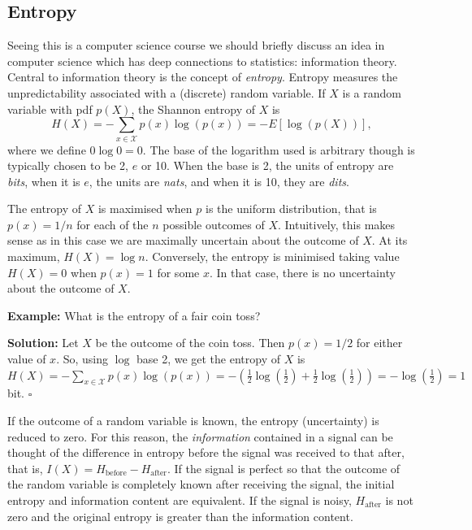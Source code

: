 \documentclass[11pt]{article}
\newcommand{\sqend}{\hfill $\square$}
\begin{document}
 \subsection{Entropy}

Seeing this is a computer science course we should briefly discuss an idea in computer science which has deep connections to statistics: information theory.  Central to information theory is the concept of {\em entropy}.  Entropy measures the unpredictability associated with a (discrete) random variable.  If $X$ is a random variable with pdf $p(X)$, the Shannon entropy of $X$ is 
\[H(X) = -\sum_{x \in \mathcal{X}} p(x) \log(p(x))  = -E[\log(p(X))],\]  where we define $0\log 0 = 0$.  The base of the logarithm used is arbitrary though is typically chosen to be 2, $e$ or 10.   When the base is 2, the units of entropy are {\em bits}, when it is $e$, the units  are {\em nats}, and  when it is 10, they are {\em dits}.
 
The entropy of $X$ is maximised when $p$ is the uniform distribution, that is $p(x) = 1/n$ for each of the $n$ possible outcomes of $X$.  Intuitively, this makes sense as in this case we are maximally uncertain about the outcome of $X$.  At its maximum, $H(X) = \log n$.  Conversely, the entropy is minimised taking value $H(X) = 0$ when $p(x) = 1$ for some $x$.  In that case, there is no uncertainty about the outcome of $X$. 

{\bf Example:} What is the entropy of a fair coin toss?

{\bf Solution:}  Let $X$ be the outcome of the coin toss.  Then $p(x) =1/2$ for either value of $x$.  So, using $\log$ base 2, we get the entropy of $X$ is  $H(X) = -\sum_{x \in \mathcal{X}} p(x) \log(p(x))  =    - (\frac 1 2 \log(\frac 1 2) + \frac 1 2 \log(\frac 1 2) )= -  \log(\frac 1 2)  = 1$ bit. \sqend


If the outcome of a random variable is known, the entropy (uncertainty) is reduced to zero.  For this reason, the {\em information} contained in a  signal can be thought of the difference in entropy before the signal was received to that after, that is, $I(X)  = H_{\mbox{before}} - H_{\mbox{after}}$. If the signal is perfect so that the outcome of the random variable is completely known after receiving the signal, the initial entropy and information content are equivalent.  If the signal is noisy, $H_{\mbox{after}}$ is not zero and the original entropy is greater than the information content.
\end{document}

